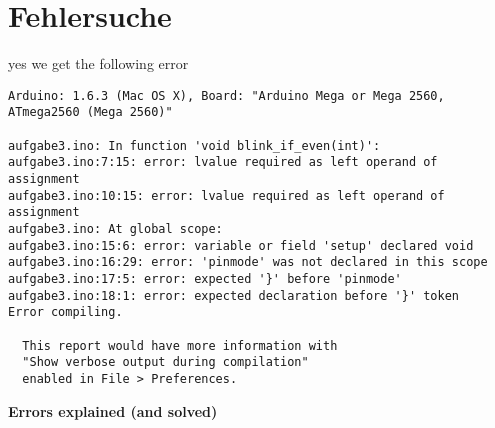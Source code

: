 \documentclass[12pt]{article}
\begin{document}
\section{Fehlersuche}

yes we get the following error
\begin{verbatim}
Arduino: 1.6.3 (Mac OS X), Board: "Arduino Mega or Mega 2560, ATmega2560 (Mega 2560)"

aufgabe3.ino: In function 'void blink_if_even(int)':
aufgabe3.ino:7:15: error: lvalue required as left operand of assignment
aufgabe3.ino:10:15: error: lvalue required as left operand of assignment
aufgabe3.ino: At global scope:
aufgabe3.ino:15:6: error: variable or field 'setup' declared void
aufgabe3.ino:16:29: error: 'pinmode' was not declared in this scope
aufgabe3.ino:17:5: error: expected '}' before 'pinmode'
aufgabe3.ino:18:1: error: expected declaration before '}' token
Error compiling.

  This report would have more information with
  "Show verbose output during compilation"
  enabled in File > Preferences.

\end{verbatim}
\textbf{Errors explained (and solved)}
\end{document}
